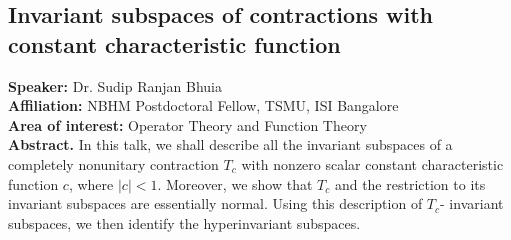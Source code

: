 \subsection*{Invariant subspaces of contractions with constant characteristic function} %
\noindent
\textbf{Speaker:} Dr. Sudip Ranjan Bhuia \\ %
\textbf{Affiliation:} NBHM Postdoctoral Fellow, TSMU, ISI Bangalore \\ %
\textbf{Area of interest:} Operator Theory and Function Theory \\ 

\noindent\textbf{Abstract.} In this talk, we shall describe all the invariant subspaces of a completely nonunitary contraction $T_c$ with nonzero scalar constant characteristic function $c$, where $|c|<1$. Moreover, we show that $T_c$ and the restriction to its invariant subspaces are essentially normal. Using this description of $T_c$- invariant subspaces, we then identify the hyperinvariant subspaces.


